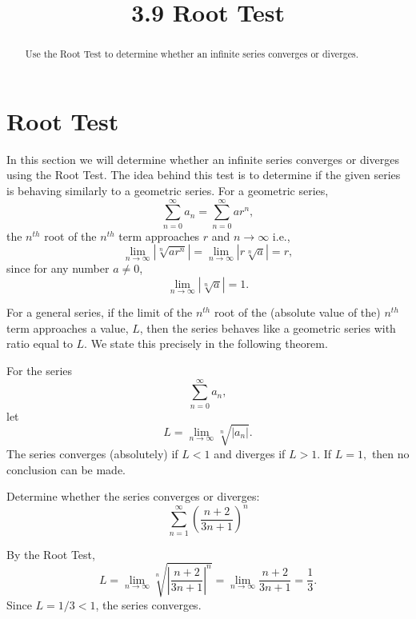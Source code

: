 \documentclass{ximera}
\title{3.9 Root Test}
\begin{document}
\begin{abstract}
Use the Root Test to determine whether an infinite series converges or diverges.
\end{abstract}

\maketitle

\section{Root Test}

In this section we will determine whether an infinite series converges or diverges using the Root Test. 
The idea behind this test is to determine if the given series is behaving similarly to a geometric series.
For a geometric series, 
\[
\sum_{n=0}^\infty a_n = \sum_{n=0}^\infty ar^n,
\]
the $n^{th}$ root of the $n^{th}$ term approaches $r$ and $n \to \infty$ i.e., 
\[
\lim_{n \to \infty} \left|\sqrt[n]{ar^n}\right| = \lim_{n \to \infty} \left|r\sqrt[n]{a}\right| = r,
\]
since for any number $a \neq 0$, 
\[
\lim_{n \to \infty}  \left|\sqrt[n]{a}\right| = 1.
\]


For a general series, if the limit of the $n^{th}$ root of the (absolute value of the) $n^{th}$ term
approaches a value, $L$, then the series behaves like a geometric series with ratio equal to $L$.
We state this precisely in the following theorem.

\begin{theorem}
For the series
\[
\sum_{n=0}^\infty a_n,
\]
let
\[
L = \lim_{n \to \infty} \sqrt[n]{\left|{a_n}\right|}.
\]
The series converges (absolutely) if $L < 1$ and diverges if $L>1$. 
If $L = 1,$ then no conclusion can be made.

\end{theorem}






\begin{example}[example 1]
Determine whether the series converges or diverges:
\[
\sum_{n=1}^\infty \left(\frac{n+ 2}{3n+1}\right)^n
\]


By the Root Test,
\[
L =  \lim_{n \to \infty} \sqrt[n]{\left|\frac{n+ 2}{3n+1}\right|^n} = \lim_{n \to \infty} \frac{n+ 2}{3n+1} = \frac13.
\]
Since $L = 1/3 < 1$, the series converges.

\end{example}





\begin{center}
\begin{foldable}
\end{foldable}
\end{center}
\end{document}
